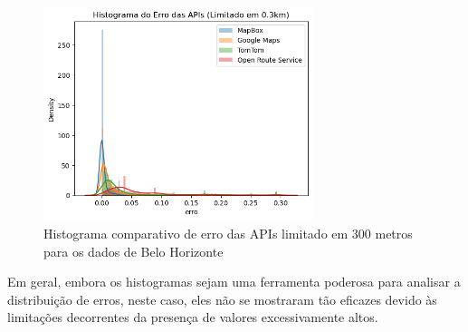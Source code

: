 \begin{figure}[h]
  \centering
  \includegraphics[width=0.7\textwidth]{Figuras/histLimitadoBH.png}
  \caption{Histograma comparativo de erro das APIs limitado em 300 metros para os dados de Belo Horizonte}
  \label{fig:histLimitadoBH}
\end{figure}

Em geral, embora os histogramas sejam uma ferramenta poderosa para analisar a distribuição de erros, neste caso, eles não se mostraram tão eficazes devido às limitações decorrentes da presença de valores excessivamente altos.




